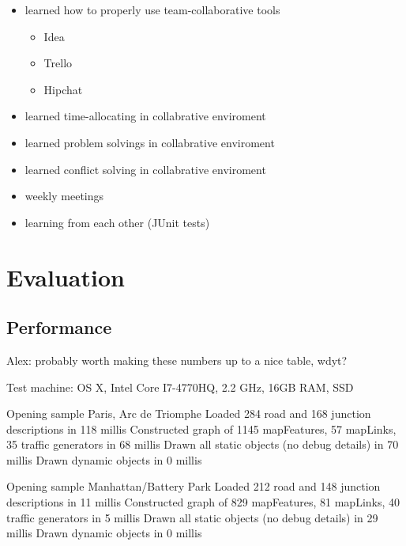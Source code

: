     \begin{itemize}
        \item learned how to properly use team-collaborative tools

            \begin{itemize}
                \item Idea
                \item Trello
                \item Hipchat
         \end{itemize}
        \item learned time-allocating in collabrative enviroment
        \item learned  problem solvings in collabrative enviroment
        \item learned  conflict solving in collabrative enviroment
        \item weekly meetings
        \item learning from each other (JUnit tests)

    \end {itemize}

\section{Evaluation}

\subsection{Performance}

Alex: probably worth making these numbers up to a nice table, wdyt?

Test machine: OS X, Intel Core I7-4770HQ, 2.2 GHz, 16GB RAM, SSD

Opening sample Paris, Arc de Triomphe
Loaded 284 road and 168 junction descriptions in 118 millis
Constructed graph of 1145 mapFeatures, 57 mapLinks, 35 traffic generators in 68 millis
Drawn all static objects (no debug details) in 70 millis
Drawn dynamic objects in 0 millis

Opening sample Manhattan/Battery Park
Loaded 212 road and 148 junction descriptions in 11 millis
Constructed graph of 829 mapFeatures, 81 mapLinks, 40 traffic generators in 5 millis
Drawn all static objects (no debug details) in 29 millis
Drawn dynamic objects in 0 millis

